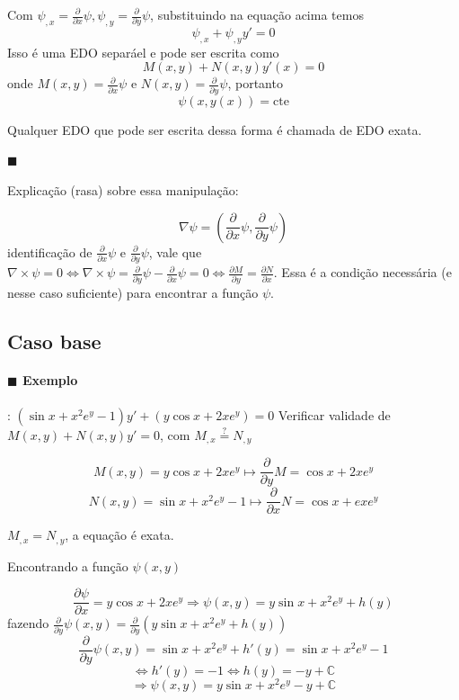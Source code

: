  Com \( \psi_{, x} = \frac{\partial }{\partial x} \psi, \psi_{, y} = \frac{\partial }{\partial y} \psi\), substituindo na equação acima temos
 \[ \psi_{,x} + \psi_{,y}y' = 0 \]
 Isso é uma EDO separáel e pode ser escrita como
 \[ M(x, y) + N(x, y) y'(x) = 0 \]
 onde \( M(x, y) = \frac{\partial }{\partial x} \psi \)  e \( N(x, y) = \frac{\partial }{\partial y} \psi \), portanto
 \[ \psi(x, y(x)) = \text{cte} \]
 
 Qualquer EDO que pode ser escrita dessa forma é chamada de EDO exata.



 \paragraph{$\blacksquare$} Explicação (rasa) sobre essa manipulação:

 \[ \nabla \psi = \left( \frac{\partial }{\partial x} \psi, \frac{\partial }{\partial y} \psi \right) \]
 identificação de \( \frac{\partial }{\partial x} \psi \)  e \( \frac{\partial }{\partial y} \psi \), vale que
 \( \nabla \times \psi = 0 \Leftrightarrow \nabla \times \psi = \frac{\partial }{\partial y} \psi - \frac{\partial }{\partial x} \psi = 0  \Leftrightarrow \frac{\partial M}{\partial y} = \frac{\partial N}{\partial x}\).
 Essa é a condição necessária (e nesse caso suficiente) para encontrar a função \( \psi \).
 



    \subsection{Caso base}
    \paragraph{$\blacksquare$ Exemplo}: $(\sin x + x^2 e^y -1) y' + (y \cos x + 2x e^y ) = 0$ 
    Verificar validade de \( M(x, y) + N(x, y) y' = 0 \), com \( M_{,x} \overset{?}{=} N_{,y} \) 

    \[ M(x, y) = y \cos x + 2x e^y \mapsto \frac{\partial }{\partial y} M = \cos x + 2x e^y \]
    \[ N(x, y) = \sin x + x^2 e^y - 1 \mapsto \frac{\partial }{\partial x} N = \cos x + ex e^y \]

    \( M_{,x} = N_{,y} \), a equação é exata.


    Encontrando a função \( \psi(x, y) \) 

    \[ \frac{\partial \psi}{\partial x}  = y \cos x + 2x e^y \Rightarrow \psi(x, y) = y \sin x + x^2 e^y + h(y) \]
    fazendo \( \frac{\partial }{\partial y} \psi(x, y) = \frac{\partial }{\partial y}  \left( y \sin x + x^2 e^y + h(y) \right) \) 
    \[ \frac{\partial }{\partial y} \psi(x, y) = \sin x + x^2 e^y + h'(y) = \sin x + x^2 e^y - 1 \]
    \[ \Leftrightarrow h'(y) = -1 \Leftrightarrow h(y) = -y + \mathbb{C} \]
    \[ \Longrightarrow  \psi(x, y) = y \sin x + x^2 e^y - y + \mathbb{C} \]

